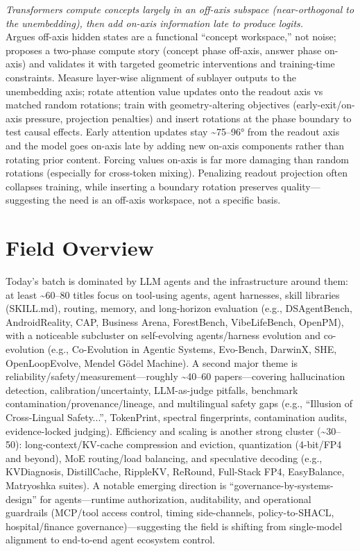 \documentclass[12pt,letterpaper]{article}
\begin{document}
{\small\textit{Transformers compute concepts largely in an off-axis subspace (near-orthogonal to the unembedding), then add on-axis information late to produce logits.}}\\[1pt]
{\footnotesize Argues off-axis hidden states are a functional ``concept workspace,'' not noise; proposes a two-phase compute story (concept phase off-axis, answer phase on-axis) and validates it with targeted geometric interventions and training-time constraints. Measure layer-wise alignment of sublayer outputs to the unembedding axis; rotate attention value updates onto the readout axis vs matched random rotations; train with geometry-altering objectives (early-exit/on-axis pressure, projection penalties) and insert rotations at the phase boundary to test causal effects. Early attention updates stay \textasciitilde{}75--96° from the readout axis and the model goes on-axis late by adding new on-axis components rather than rotating prior content. Forcing values on-axis is far more damaging than random rotations (especially for cross-token mixing). Penalizing readout projection often collapses training, while inserting a boundary rotation preserves quality---suggesting the need is an off-axis workspace, not a specific basis.}

\medskip



\section*{Field Overview}
{\footnotesize Today's batch is dominated by LLM agents and the infrastructure around them: at least \textasciitilde{}60--80 titles focus on tool-using agents, agent harnesses, skill libraries (SKILL.md), routing, memory, and long-horizon evaluation (e.g., DSAgentBench, AndroidReality, CAP, Business Arena, ForestBench, VibeLifeBench, OpenPM), with a noticeable subcluster on self-evolving agents/harness evolution and co-evolution (e.g., Co-Evolution in Agentic Systems, Evo-Bench, DarwinX, SHE, OpenLoopEvolve, Mendel Gödel Machine). A second major theme is reliability/safety/measurement---roughly \textasciitilde{}40--60 papers---covering hallucination detection, calibration/uncertainty, LLM-as-judge pitfalls, benchmark contamination/provenance/lineage, and multilingual safety gaps (e.g., ``Illusion of Cross-Lingual Safety...'', TokenPrint, spectral fingerprints, contamination audits, evidence-locked judging). Efficiency and scaling is another strong cluster (\textasciitilde{}30--50): long-context/KV-cache compression and eviction, quantization (4-bit/FP4 and beyond), MoE routing/load balancing, and speculative decoding (e.g., KVDiagnosis, DistillCache, RippleKV, ReRound, Full-Stack FP4, EasyBalance, Matryoshka suites). A notable emerging direction is ``governance-by-systems-design'' for agents---runtime authorization, auditability, and operational guardrails (MCP/tool access control, timing side-channels, policy-to-SHACL, hospital/finance governance)---suggesting the field is shifting from single-model alignment to end-to-end agent ecosystem control.}
\end{document}
